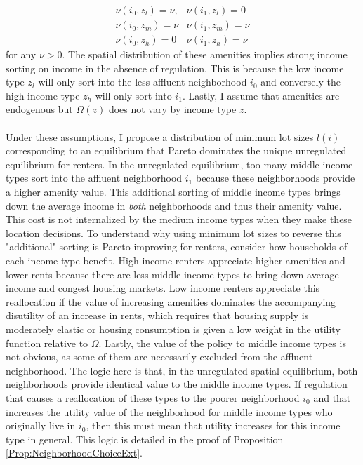 \documentclass[11pt]{article}
\begin{document}
	\begin{eqnarray*}
		\nu(i_{0}, z_{l})  = \nu , & \nu(i_{1}, z_{l}) = 0 \\
		\nu(i_{0}, z_{m})  = \nu & \nu(i_{1}, z_{m})  = \nu \\ 
		\nu(i_{0}, z_{h})  = 0 & \nu(i_{1}, z_{h})  = \nu
	\end{eqnarray*}
	for any $\nu > 0$. The spatial distribution of these amenities implies strong income sorting on income in the absence of regulation. This is because the low income type $z_{l}$ will only sort into the less affluent neighborhood $i_{0}$ and conversely the high income type $z_{h}$ will only sort into $i_{1}$. Lastly, I assume that amenities are endogenous but $\Omega(z)$ does not vary by income type $z$. 
	\paragraph*{}
	Under these assumptions, I propose a distribution of minimum lot sizes $l(i)$ corresponding to an equilibrium that Pareto dominates the unique unregulated equilibrium for renters. In the unregulated equilibrium, too many middle income types sort into the affluent neighborhood $i_{1}$ because these neighborhoods provide a higher amenity value. This additional sorting of middle income types brings down the average income in \textit{both} neighborhoods and thus their amenity value. This cost is not internalized by the medium income types when they make these location decisions. To understand why using minimum lot sizes to reverse this "additional" sorting is Pareto improving for renters, consider how households of each income type benefit. High income renters appreciate higher amenities and lower rents because there are less middle income types to bring down average income and congest housing markets. Low income renters appreciate this reallocation if the value of increasing amenities dominates the accompanying disutility of an increase in rents, which requires that housing supply is moderately elastic or housing consumption is given a low weight in the utility function relative to $\Omega$. Lastly, the value of the policy to middle income types is not obvious, as some of them are necessarily excluded from the affluent neighborhood. The logic here is that, in the unregulated spatial equilibrium, both neighborhoods provide identical value to the middle income types. If regulation that causes a reallocation of these types to the poorer neighborhood $i_{0}$ and that increases the utility value of the neighborhood for middle income types who originally live in $i_{0}$, then this must mean that utility increases for this income type in general. This logic is detailed in the proof of Proposition \ref{Prop:NeighborhoodChoiceExt}. 
	
\end{document}
